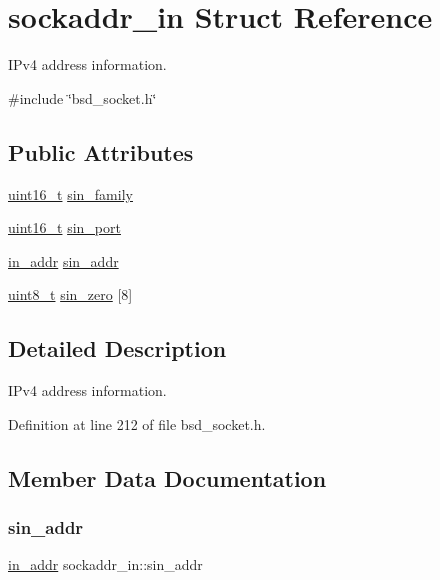 \hypertarget{structsockaddr__in}{}\section{sockaddr\+\_\+in Struct Reference}
\label{structsockaddr__in}


I\+Pv4 address information.  




{\ttfamily \#include \char`\"{}bsd\+\_\+socket.\+h\char`\"{}}

\subsection*{Public Attributes}
\begin{DoxyCompactItemize}
\item 
\hyperlink{stdint_8h_a273cf69d639a59973b6019625df33e30}{uint16\+\_\+t} \hyperlink{structsockaddr__in_a1b187e5b6abc36bcf03efe678448ed75}{sin\+\_\+family}
\item 
\hyperlink{stdint_8h_a273cf69d639a59973b6019625df33e30}{uint16\+\_\+t} \hyperlink{structsockaddr__in_a3cf9239fdd8bd32855d66a4b86349fbb}{sin\+\_\+port}
\item 
\hyperlink{structin__addr}{in\+\_\+addr} \hyperlink{structsockaddr__in_a30c6a5a4acce80d162371161077946b6}{sin\+\_\+addr}
\item 
\hyperlink{stdint_8h_aba7bc1797add20fe3efdf37ced1182c5}{uint8\+\_\+t} \hyperlink{structsockaddr__in_a4b2d5781ba9ced14492aea899b4e3274}{sin\+\_\+zero} \mbox{[}8\mbox{]}
\end{DoxyCompactItemize}


\subsection{Detailed Description}
I\+Pv4 address information. 

Definition at line 212 of file bsd\+\_\+socket.\+h.



\subsection{Member Data Documentation}
\mbox{\label{structsockaddr__in_a30c6a5a4acce80d162371161077946b6}} 
\subsubsection{\texorpdfstring{sin\+\_\+addr}{sin\_addr}}
{\footnotesize\ttfamily \hyperlink{structin__addr}{in\+\_\+addr} sockaddr\+\_\+in\+::sin\+\_\+addr}



